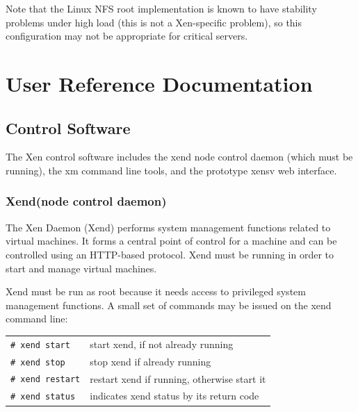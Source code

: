 \documentclass[11pt,twoside,final,openright]{report}
\def\Xend{{Xend}\xspace}
\def\xend{{xend}\xspace}
\begin{document}
Note that the Linux NFS root implementation is known to have stability
problems under high load (this is not a Xen-specific problem), so this
configuration may not be appropriate for critical servers.


\part{User Reference Documentation}

\chapter{Control Software} 

The Xen control software includes the \xend node control daemon (which 
must be running), the xm command line tools, and the prototype 
xensv web interface. 

\section{\Xend (node control daemon)}
\label{s:xend}

The Xen Daemon (\Xend) performs system management functions related to
virtual machines.  It forms a central point of control for a machine
and can be controlled using an HTTP-based protocol.  \Xend must be
running in order to start and manage virtual machines.

\Xend must be run as root because it needs access to privileged system
management functions.  A small set of commands may be issued on the
\xend command line:

\begin{tabular}{ll}
\verb!# xend start! & start \xend, if not already running \\
\verb!# xend stop!  & stop \xend if already running       \\
\verb!# xend restart! & restart \xend if running, otherwise start it \\
\verb!# xend status! & indicates \xend status by its return code
\end{tabular}
\end{document}

